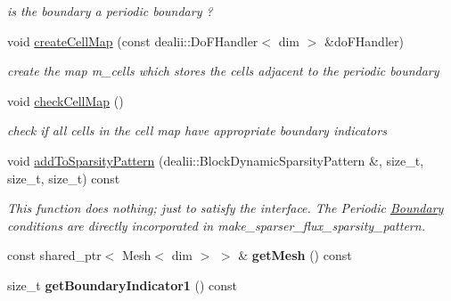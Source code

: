 \begin{DoxyCompactItemize}
\begin{DoxyCompactList}\small\item\em is the boundary a periodic boundary ? \item\end{DoxyCompactList}\item 
void \hyperlink{classnatrium_1_1PeriodicBoundary_a233d460baa307b13bc32efb57c07f7c5}{createCellMap} (const dealii::DoFHandler$<$ dim $>$ \&doFHandler)
\begin{DoxyCompactList}\small\item\em create the map m\_\-cells which stores the cells adjacent to the periodic boundary \item\end{DoxyCompactList}\item 
\hypertarget{classnatrium_1_1PeriodicBoundary_a036bc3340a3217dfe4f916d5c2b29299}{
void \hyperlink{classnatrium_1_1PeriodicBoundary_a036bc3340a3217dfe4f916d5c2b29299}{checkCellMap} ()}
\label{classnatrium_1_1PeriodicBoundary_a036bc3340a3217dfe4f916d5c2b29299}

\begin{DoxyCompactList}\small\item\em check if all cells in the cell map have appropriate boundary indicators \item\end{DoxyCompactList}\item 
\hypertarget{classnatrium_1_1PeriodicBoundary_a8523a2b22bfacc8aa299c5a9c238ffdd}{
void \hyperlink{classnatrium_1_1PeriodicBoundary_a8523a2b22bfacc8aa299c5a9c238ffdd}{addToSparsityPattern} (dealii::BlockDynamicSparsityPattern \&, size\_\-t, size\_\-t, size\_\-t) const }
\label{classnatrium_1_1PeriodicBoundary_a8523a2b22bfacc8aa299c5a9c238ffdd}

\begin{DoxyCompactList}\small\item\em This function does nothing; just to satisfy the interface. The Periodic \hyperlink{classnatrium_1_1Boundary}{Boundary} conditions are directly incorporated in make\_\-sparser\_\-flux\_\-sparsity\_\-pattern. \item\end{DoxyCompactList}\item 
\hypertarget{classnatrium_1_1PeriodicBoundary_a660df6687c1b1d401654042186f2317f}{
const shared\_\-ptr$<$ Mesh$<$ dim $>$ $>$ \& {\bfseries getMesh} () const }
\label{classnatrium_1_1PeriodicBoundary_a660df6687c1b1d401654042186f2317f}

\item 
\hypertarget{classnatrium_1_1PeriodicBoundary_aead325214d43693a03a5d24613f4fe14}{
size\_\-t {\bfseries getBoundaryIndicator1} () const }
\label{classnatrium_1_1PeriodicBoundary_aead325214d43693a03a5d24613f4fe14}


\end{DoxyCompactItemize}
